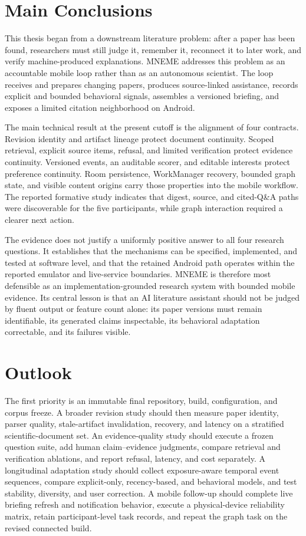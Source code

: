 \section{Main Conclusions}

This thesis began from a downstream literature problem: after a paper has been found, researchers must still judge it, remember it, reconnect it to later work, and verify machine-produced explanations.
MNEME addresses this problem as an accountable mobile loop rather than as an autonomous scientist.
The loop receives and prepares changing papers, produces source-linked assistance, records explicit and bounded behavioral signals, assembles a versioned briefing, and exposes a limited citation neighborhood on Android.

The main technical result at the present cutoff is the alignment of four contracts.
Revision identity and artifact lineage protect document continuity.
Scoped retrieval, explicit source items, refusal, and limited verification protect evidence continuity.
Versioned events, an auditable scorer, and editable interests protect preference continuity.
Room persistence, WorkManager recovery, bounded graph state, and visible content origins carry those properties into the mobile workflow.
The reported formative study indicates that digest, source, and cited-Q\&A paths were discoverable for the five participants, while graph interaction required a clearer next action.

The evidence does not justify a uniformly positive answer to all four research questions.
It establishes that the mechanisms can be specified, implemented, and tested at software level, and that the retained Android path operates within the reported emulator and live-service boundaries.
MNEME is therefore most defensible as an implementation-grounded research system with bounded mobile evidence.
Its central lesson is that an AI literature assistant should not be judged by fluent output or feature count alone: its paper versions must remain identifiable, its generated claims inspectable, its behavioral adaptation correctable, and its failures visible.

\section{Outlook}

The first priority is an immutable final repository, build, configuration, and corpus freeze.
A broader revision study should then measure paper identity, parser quality, stale-artifact invalidation, recovery, and latency on a stratified scientific-document set.
An evidence-quality study should execute a frozen question suite, add human claim--evidence judgments, compare retrieval and verification ablations, and report refusal, latency, and cost separately.
A longitudinal adaptation study should collect exposure-aware temporal event sequences, compare explicit-only, recency-based, and behavioral models, and test stability, diversity, and user correction.
A mobile follow-up should complete live briefing refresh and notification behavior, execute a physical-device reliability matrix, retain participant-level task records, and repeat the graph task on the revised connected build.

